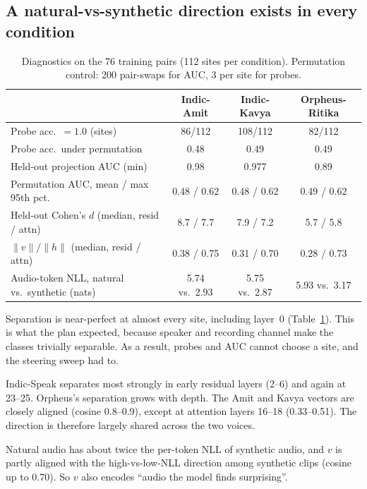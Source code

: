 \documentclass[11pt]{article}
\begin{document}
\subsection{A natural-vs-synthetic direction exists in every condition}
\begin{table}[h]
\centering
\caption{Diagnostics on the 76 training pairs (112 sites per condition). Permutation control: 200 pair-swaps for AUC, 3 per site for probes.}
\label{tab:diag}
\begin{tabular}{lccc}
\toprule
 & Indic-Amit & Indic-Kavya & Orpheus-Ritika \\
\midrule
Probe acc.\ $=1.0$ (sites) & 86/112 & 108/112 & 82/112 \\
Probe acc.\ under permutation & 0.48 & 0.49 & 0.49 \\
Held-out projection AUC (min) & 0.98 & 0.977 & 0.89 \\
Permutation AUC, mean / max 95th pct. & 0.48 / 0.62 & 0.48 / 0.62 & 0.49 / 0.62 \\
Held-out Cohen's $d$ (median, resid / attn) & 8.7 / 7.7 & 7.9 / 7.2 & 5.7 / 5.8 \\
$\|v\|/\|h\|$ (median, resid / attn) & 0.38 / 0.75 & 0.31 / 0.70 & 0.28 / 0.73 \\
Audio-token NLL, natural vs.\ synthetic (nats) & 5.74 vs.\ 2.93 & 5.75 vs.\ 2.87 & 5.93 vs.\ 3.17 \\
\bottomrule
\end{tabular}
\end{table}

Separation is near-perfect at almost every site, including layer~0 (Table~\ref{tab:diag}). This is what the plan expected, because speaker and recording channel make the classes trivially separable. As a result, probes and AUC cannot choose a site, and the steering sweep had to.

Indic-Speak separates most strongly in early residual layers (2--6) and again at 23--25. Orpheus's separation grows with depth. The Amit and Kavya vectors are closely aligned (cosine 0.8--0.9), except at attention layers 16--18 (0.33--0.51). The direction is therefore largely shared across the two voices.

Natural audio has about twice the per-token NLL of synthetic audio, and $v$ is partly aligned with the high-vs-low-NLL direction among synthetic clips (cosine up to 0.70). So $v$ also encodes ``audio the model finds surprising''.
\end{document}
